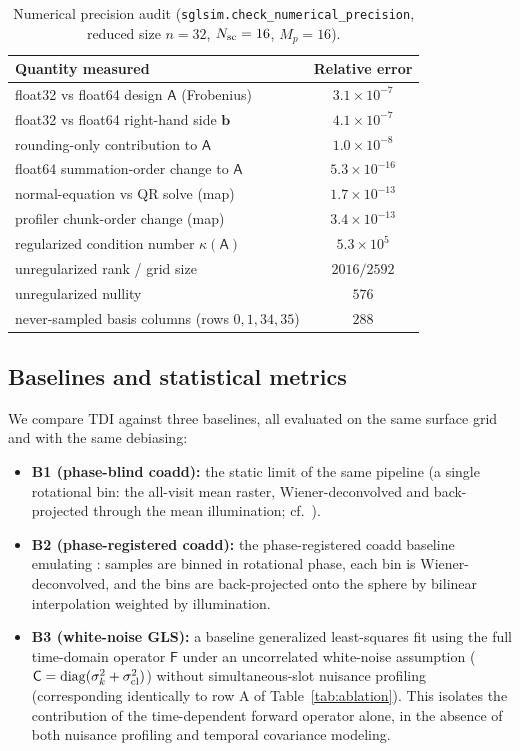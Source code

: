 \documentclass[twocolumn,10pt]{article}
\begin{document}
\begin{table}[t]
\centering
\caption{Numerical precision audit (\texttt{sglsim.check\_numerical\_precision},
reduced size $n=32$, $N_{\rm sc}=16$, $M_p=16$).}
\label{tab:precision}
\footnotesize
\setlength{\tabcolsep}{3pt}
\begin{tabular}{lc}
\toprule
Quantity measured & Relative error \\
\midrule
float32 vs float64 design $\mathsf{A}$ (Frobenius) & $3.1\times10^{-7}$ \\
float32 vs float64 right-hand side $\mathbf{b}$ & $4.1\times10^{-7}$ \\
rounding-only contribution to $\mathsf{A}$ & $1.0\times10^{-8}$ \\
float64 summation-order change to $\mathsf{A}$ & $5.3\times10^{-16}$ \\
normal-equation vs QR solve (map) & $1.7\times10^{-13}$ \\
profiler chunk-order change (map) & $3.4\times10^{-13}$ \\
regularized condition number $\kappa(\mathsf{A})$ & $5.3\times10^{5}$ \\
unregularized rank / grid size & $2016/2592$ \\
unregularized nullity & $576$ \\
never-sampled basis columns (rows $0,1,34,35$) & $288$ \\
\bottomrule
\end{tabular}
\end{table}

\subsection{Baselines and statistical metrics}
\label{sec:baselines}
We compare TDI against three baselines, all evaluated on the same surface grid and with the same debiasing:
\begin{itemize}
\item {\bf B1 (phase-blind coadd):} the static limit of the same pipeline (a single rotational bin: the all-visit mean raster, Wiener-deconvolved and back-projected through the mean illumination; cf.\ \citealt{toth21}).
\item {\bf B2 (phase-registered coadd):} the phase-registered coadd baseline emulating \citet{tur26bench}: samples are binned in rotational phase, each bin is Wiener-deconvolved, and the bins are back-projected onto the sphere by bilinear interpolation weighted by illumination.
\item {\bf B3 (white-noise GLS):} a baseline generalized least-squares fit using the full time-domain operator $\mathsf{F}$ under an uncorrelated white-noise assumption ($\mathsf{C} = \mathrm{diag}(\sigma_k^2 + \sigma_{\rm cl}^2)$) without simultaneous-slot nuisance profiling (corresponding identically to row A of Table~\ref{tab:ablation}). This isolates the contribution of the time-dependent forward operator alone, in the absence of both nuisance profiling and temporal covariance modeling.
\end{itemize}
\end{document}
